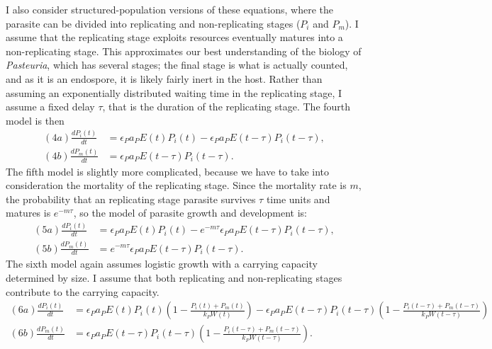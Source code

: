 \documentclass[12pt,reqno,final,pdftex]{amsart}\usepackage[]{graphicx}\usepackage[]{color}
\theoremstyle{plain}
\numberwithin{equation}{part}
\begin{document}
I also consider structured-population versions of these equations,
where the parasite can be divided into replicating and non-replicating
stages ($P_i$ and $P_m$).
I assume that the replicating stage exploits resources eventually
matures into a non-replicating stage.
This approximates our best understanding of the biology of
\emph{Pasteuria}, which has several stages; the final stage is what is
actually counted, and as it is an endospore, it is likely fairly inert in
the host.
Rather than assuming an exponentially distributed waiting time in the
replicating stage, I assume a fixed delay $\tau$, that is the duration
of the replicating stage.
The fourth model is then
\begin{align}
(4a) \frac{dP_i(t)}{dt} &= \epsilon_P a_P E(t) P_i(t) - \epsilon_P a_P
                          E(t-\tau) P_i(t-\tau), \\
(4b) \frac{dP_m(t)}{dt} &= \epsilon_P a_P E(t-\tau) P_i(t-\tau).
\end{align}
The fifth model is slightly more complicated, because we have to take
into consideration the mortality of the replicating stage.
Since the mortality rate is $m$, the probability that an replicating
stage parasite survives $\tau$ time units and matures is $e^{-m
  \tau}$, so the model of parasite growth and development is:
\begin{align}
(5a) \frac{dP_i(t)}{dt} &= \epsilon_P a_P E(t) P_i(t) - e^{-m \tau}\epsilon_P a_P
                          E(t-\tau) P_i(t-\tau), \\
(5b) \frac{dP_m(t)}{dt} &= e^{-m \tau} \epsilon_P a_P E(t-\tau) P_i(t-\tau).
\end{align}
The sixth model again assumes logistic growth with a carrying capacity
determined by size.
I assume that both replicating and non-replicating stages contribute
to the carrying capacity.
\begin{align}
(6a) \frac{dP_i(t)}{dt} &= \epsilon_P a_P E(t) P_i(t) \left(1 -
                          \frac{P_i(t)+P_m(t)}{k_P W(t)}\right) - \epsilon_P a_P E(t-\tau) P_i(t-\tau) \left(1 -
                          \frac{P_i(t-\tau)+P_m(t-\tau)}{k_P
                          W(t-\tau)}\right) \\
(6b) \frac{dP_m(t)}{dt} &= \epsilon_P a_P E(t-\tau) P_i(t-\tau) \left(1 -
                          \frac{P_i(t-\tau)+P_m(t-\tau)}{k_P W(t-\tau)}\right).
\end{align}
\end{document}
